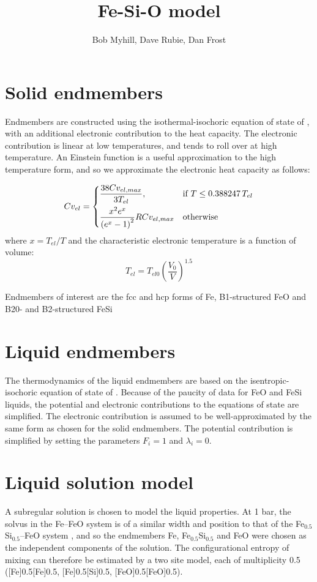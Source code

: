 \documentclass[11pt,a4paper,english]{article}
\title{Fe-Si-O model}
\author{Bob Myhill, Dave Rubie, Dan Frost}
\begin{document}
\maketitle

\section{Solid endmembers}
Endmembers are constructed using the isothermal-isochoric equation of state of \cite{SLB2011}, with an additional electronic contribution to the heat capacity. The electronic contribution is linear at low temperatures, and tends to roll over at high temperature. An Einstein function is a useful approximation to the high temperature form, and so we approximate the electronic heat capacity as follows:

\[
    Cv_{el}= 
\begin{dcases}
    \frac{38 Cv_{el, max}}{3 T_{el}},& \text{if } T \leq 0.388247\, T_{el}\\
    \frac{x^2 e^x}{\left(e^x - 1 \right)^2} R Cv_{el, max}     & \text{otherwise}
\end{dcases}
\]
\noindent where $x = T_{el}/T $ and the characteristic electronic temperature is a function of volume:
\begin{equation}
  T_{el} = T_{el0} \left(\frac{V_0}{V}\right)^{1.5}
\end{equation}

Endmembers of interest are the fcc and hcp forms of Fe, B1-structured FeO and B20- and B2-structured FeSi


\section{Liquid endmembers}
The thermodynamics of the liquid endmembers are based on the isentropic-isochoric equation of state of \cite{AA1994}. Because of the paucity of data for FeO and FeSi liquids, the potential and electronic contributions to the equations of state are simplified. The electronic contribution is assumed to be well-approximated by the same form as chosen for the solid endmembers. The potential contribution is simplified by setting the parameters $F_i=1$ and $\lambda_i=0$.


\section{Liquid solution model}
A subregular solution is chosen to model the liquid properties. At 1 bar, the solvus in the Fe--FeO system is of a similar width and position to that of the Fe$_{0.5}$Si$_{0.5}$--FeO system \citep{IP1973}, and so the endmembers Fe, Fe$_{0.5}$Si$_{0.5}$ and FeO were chosen as the independent components of the solution. The configurational entropy of mixing can therefore be estimated by a two site model, each of multiplicity 0.5 ([Fe]0.5[Fe]0.5, [Fe]0.5[Si]0.5, [FeO]0.5[FeO]0.5).
\end{document}
